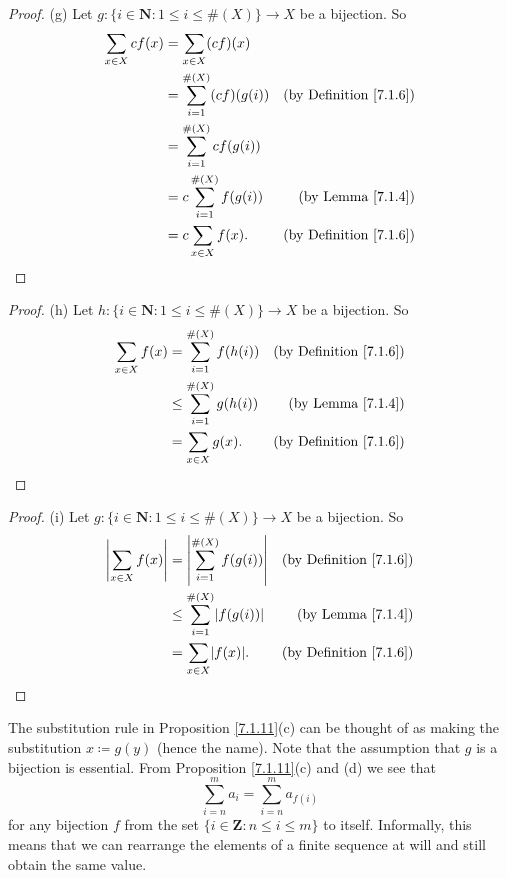 \begin{proof}{(g)}
Let \(g : \{i \in \mathbf{N} : 1 \leq i \leq \#(X)\} \to X\) be a bijection.
So
\begin{align*}
\sum_{x \in X} cf(x) &= \sum_{x \in X} (cf)(x) \\
&= \sum_{i = 1}^{\#(X)} (cf)(g(i)) & \text{(by Definition \ref{7.1.6})} \\
&= \sum_{i = 1}^{\#(X)} cf(g(i)) \\
&= c\sum_{i = 1}^{\#(X)} f(g(i)) & \text{(by Lemma \ref{7.1.4})} \\
&= c\sum_{x \in X} f(x). & \text{(by Definition \ref{7.1.6})}
\end{align*}
\end{proof}

\begin{proof}{(h)}
Let \(h : \{i \in \mathbf{N} : 1 \leq i \leq \#(X)\} \to X\) be a bijection.
So
\begin{align*}
\sum_{x \in X} f(x) &= \sum_{i = 1}^{\#(X)} f(h(i)) & \text{(by Definition \ref{7.1.6})} \\
&\leq \sum_{i = 1}^{\#(X)} g(h(i)) & \text{(by Lemma \ref{7.1.4})} \\
&= \sum_{x \in X} g(x). & \text{(by Definition \ref{7.1.6})}
\end{align*}
\end{proof}

\begin{proof}{(i)}
Let \(g : \{i \in \mathbf{N} : 1 \leq i \leq \#(X)\} \to X\) be a bijection.
So
\begin{align*}
\abs*{\sum_{x \in X} f(x)} &= \abs*{\sum_{i = 1}^{\#(X)} f(g(i))} & \text{(by Definition \ref{7.1.6})} \\
&\leq \sum_{i = 1}^{\#(X)} \abs*{f(g(i))} & \text{(by Lemma \ref{7.1.4})} \\
&= \sum_{x \in X} \abs*{f(x)}. & \text{(by Definition \ref{7.1.6})}
\end{align*}
\end{proof}

\begin{remark}\label{7.1.12}
The substitution rule in Proposition \ref{7.1.11}(c) can be thought of as making the substitution \(x \coloneqq g(y)\) (hence the name).
Note that the assumption that \(g\) is a bijection is essential.
From Proposition \ref{7.1.11}(c) and (d) we see that
\[
    \sum_{i = n}^m a_i = \sum_{i = n}^m a_{f(i)}
\]
for any bijection \(f\) from the set \(\{i \in \mathbf{Z} : n \leq i \leq m\}\) to itself.
Informally, this means that we can rearrange the elements of a finite sequence at will and still obtain the same value.
\end{remark}

